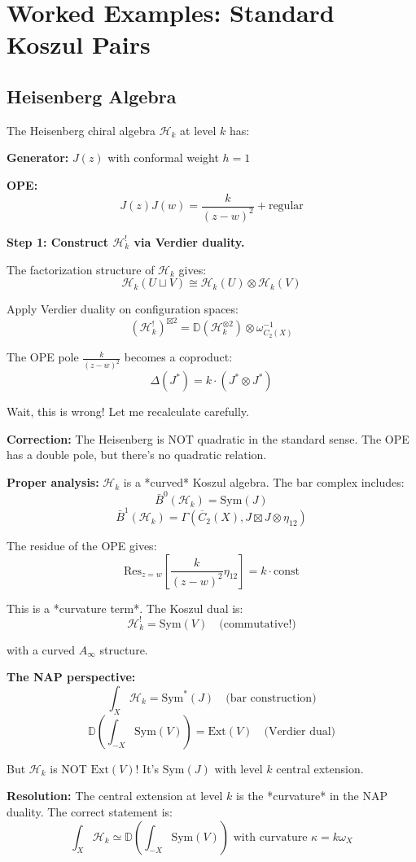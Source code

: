 \section{Worked Examples: Standard Koszul Pairs}

\subsection{Heisenberg Algebra}

\begin{example}\label{ex:heisenberg-NAP}
The Heisenberg chiral algebra $\mathcal{H}_k$ at level $k$ has:

\textbf{Generator:} $J(z)$ with conformal weight $h = 1$

\textbf{OPE:}
$$J(z) J(w) = \frac{k}{(z-w)^2} + \text{regular}$$

\textbf{Step 1: Construct $\mathcal{H}_k^!$ via Verdier duality.}

The factorization structure of $\mathcal{H}_k$ gives:
$$\mathcal{H}_k(U \sqcup V) \cong \mathcal{H}_k(U) \otimes \mathcal{H}_k(V)$$

Apply Verdier duality on configuration spaces:
$$(\mathcal{H}_k^!)^{\boxtimes 2} = \mathbb{D}(\mathcal{H}_k^{\otimes 2}) \otimes \omega_{C_2(X)}^{-1}$$

The OPE pole $\frac{k}{(z-w)^2}$ becomes a coproduct:
$$\Delta(J^*) = k \cdot (J^* \otimes J^*)$$

Wait, this is wrong! Let me recalculate carefully.

\textbf{Correction:} The Heisenberg is NOT quadratic in the standard sense. The OPE has a double pole, but there's no quadratic relation.

\textbf{Proper analysis:} $\mathcal{H}_k$ is a *curved* Koszul algebra. The bar complex includes:
$$\bar{B}^0(\mathcal{H}_k) = \text{Sym}(J)$$
$$\bar{B}^1(\mathcal{H}_k) = \Gamma(\overline{C}_2(X), J \boxtimes J \otimes \eta_{12})$$

The residue of the OPE gives:
$$\text{Res}_{z=w}\left[\frac{k}{(z-w)^2} \eta_{12}\right] = k \cdot \text{const}$$

This is a *curvature term*. The Koszul dual is:
$$\mathcal{H}_k^! = \text{Sym}(V) \quad \text{(commutative!)}$$

with a curved $A_\infty$ structure.

\textbf{The NAP perspective:}
$$\int_X \mathcal{H}_k = \text{Sym}^*(J) \quad \text{(bar construction)}$$
$$\mathbb{D}\left(\int_{-X} \text{Sym}(V)\right) = \text{Ext}(V) \quad \text{(Verdier dual)}$$

But $\mathcal{H}_k$ is NOT $\text{Ext}(V)$! It's $\text{Sym}(J)$ with level $k$ central extension.

\textbf{Resolution:} The central extension at level $k$ is the *curvature* in the NAP duality. The correct statement is:
$$\int_X \mathcal{H}_k \simeq \mathbb{D}\left(\int_{-X} \text{Sym}(V)\right) \text{ with curvature } \kappa = k \omega_X$$
\end{example}

